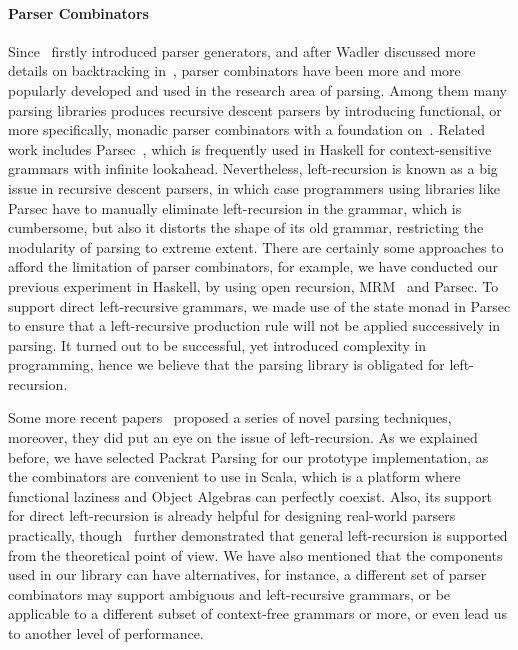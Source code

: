 \paragraph*{Parser Combinators} Since~\cite{burge1975} firstly introduced parser generators, and after Wadler discussed more details on backtracking in~\cite{Wadler1985}, parser combinators have been more and more popularly developed and used in the research area of parsing. Among them many parsing libraries produces recursive descent parsers by introducing functional, or more specifically, monadic parser combinators with a foundation on~\cite{nott237}. Related work includes Parsec~\cite{Leijen2001}, which is frequently used in Haskell for context-sensitive grammars with infinite lookahead. Nevertheless, left-recursion is known as a big issue in recursive descent parsers, in which case programmers using libraries like Parsec have to manually eliminate left-recursion in the grammar, which is cumbersome, but also it distorts the shape of its old grammar, restricting the modularity of parsing to extreme extent.
There are certainly some approaches to afford the limitation of parser combinators, for example, we have conducted our previous experiment in Haskell, by using open recursion, MRM~\cite{Oliveira2015} and Parsec. To support direct left-recursive grammars, we made use of the state monad in Parsec to ensure that a left-recursive production rule will not be applied successively in parsing. It turned out to be successful, yet introduced complexity in programming, hence we believe that the parsing library is obligated for left-recursion.

Some more recent papers~\cite{Ford2002,Might2011,Frost2008}  proposed a series of novel parsing techniques, moreover, they did put an eye on the issue of left-recursion. As we explained before, we have selected Packrat Parsing for our prototype implementation, as the combinators are convenient to use in Scala, which is a platform where functional laziness and Object Algebras can perfectly coexist. Also, its support for direct left-recursion is already helpful for designing real-world parsers practically, though~\cite{warth2008} further demonstrated that general left-recursion is supported from the theoretical point of view. We have also mentioned that the components used in our library can have alternatives, for instance, a different set of parser combinators may support ambiguous and left-recursive grammars, or be applicable to a different subset of context-free grammars or more, or even lead us to another level of performance.


